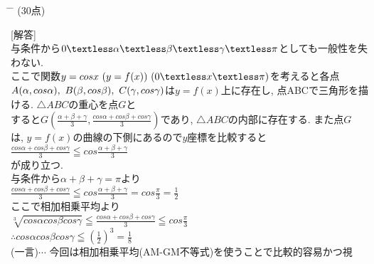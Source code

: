 \documentclass{article}
\begin{document}
\newpage
\begin{tabbing}
\hspace{0.91\textwidth} \= \hspace{0.8\textwidth} \= \kill
\textsf{}\> (30点)\>\\
\end{tabbing}
[{\large 解答}]\vspace{0.1in}\\
与条件から$0\textless \alpha \textless \beta \textless \gamma \textless\pi$としても一般性を失わない.\vspace{0.1in}\\
ここで関数$y=cosx\ (y=f(x))\ (0\textless x\textless\pi)$を考えると各点$A(\alpha, cos\alpha),\ B(\beta,cos\beta),\ C(\gamma, cos\gamma)\vspace{0.1in}\\
$は$y=f(x)$上に存在し, 点ABCで三角形を描ける. $\triangle ABC$の重心を点$G$と\vspace{0.1in}\\
すると$G(\frac{\alpha+\beta+\gamma}{3}, \frac{cos\alpha+cos\beta+cos\gamma}{3})$であり, $\triangle ABC$の内部に存在する. また点$G$\vspace{0.1in}\\
は, $y=f(x)$の曲線の下側にあるので$y$座標を比較すると\vspace{0.1in}\\
$\frac{cos\alpha+cos\beta+cos\gamma}{3}\leqq cos\frac{\alpha+\beta+\gamma}{3}$ \vspace{0.1in}\\
が成り立つ.\vspace{0.1in}\\
与条件から$\alpha+\beta+\gamma=\pi$より\vspace{0.1in}\\
$\frac{cos\alpha+cos\beta+cos\gamma}{3}\leqq cos\frac{\alpha+\beta+\gamma}{3}=cos\frac{\pi}{3}=\frac{1}{2}$ \vspace{0.1in}\\
ここで相加相乗平均より\vspace{0.1in}\\
$\sqrt[3]{cos\alpha  cos\beta cos\gamma}\leqq \frac{cos\alpha+cos\beta+cos\gamma}{3}\leqq cos\frac{\pi}{3}$\vspace{0.1in}\\
$\therefore cos\alpha cos\beta cos\gamma \leqq(\frac{1}{2})^3=\frac{1}{8}$\vspace{0.1in}\\
(一言)$\cdots$ 今回は相加相乗平均(AM-GM不等式)を使うことで比較的容易かつ視\\
\end{document}
